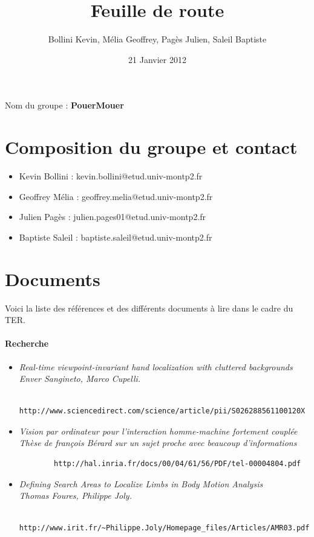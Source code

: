 \documentclass{article}
\title{Feuille de route}
\author{Bollini Kevin, Mélia Geoffrey, Pagès Julien, Saleil Baptiste}
\date{21 Janvier 2012}
\begin{document}
\maketitle
	Nom du groupe : \textbf{PouerMouer}
	\section{Composition du groupe et contact}
	
	\begin{itemize}
	\item Kevin Bollini : kevin.bollini@etud.univ-montp2.fr \\
	\item Geoffrey Mélia : geoffrey.melia@etud.univ-montp2.fr \\
	\item Julien Pagès : julien.pages01@etud.univ-montp2.fr \\
	\item Baptiste Saleil : baptiste.saleil@etud.univ-montp2.fr \\
	\end{itemize} 	

\section{Documents}
	Voici la liste des références et des différents documents à lire dans le cadre du TER. 

	\paragraph{Recherche}
	\begin{itemize}
		\item \it{Real-time viewpoint-invariant hand localization with cluttered backgrounds} \\
		Enver Sangineto, Marco Cupelli.
		\begin{verbatim}
		http://www.sciencedirect.com/science/article/pii/S026288561100120X
		\end{verbatim}
		\item \it{Vision par ordinateur pour l’interaction homme-machine fortement couplée}\\
		Thèse de françois Bérard sur un sujet proche avec beaucoup d'informations
		\begin{verbatim}
		http://hal.inria.fr/docs/00/04/61/56/PDF/tel-00004804.pdf
		\end{verbatim}
		\item \it{Defining Search Areas to Localize Limbs in Body Motion Analysis} \\
		Thomas Foures, Philippe Joly.
		\begin{verbatim}
		http://www.irit.fr/~Philippe.Joly/Homepage_files/Articles/AMR03.pdf
		\end{verbatim}
	\end{itemize}
\end{document}
